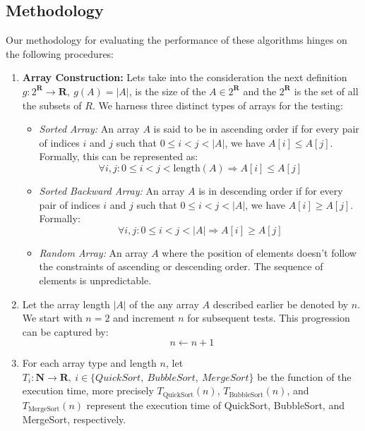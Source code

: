 \subsection{Methodology}
Our methodology for evaluating the performance of these algorithms hinges on the following procedures:
\begin{enumerate}
    \item \textbf{Array Construction:} Lets take into the consideration the next definition $g: 2^{\mathbf{R}} \rightarrow \mathbf{R},\  g(A) = |A|$, is the size of the $A \in 2^{\mathbf{R}}$ and the $2^{\mathbf{R}}$ is the set of all the subsets of $R$. We harness three distinct types of arrays for the testing:
    \begin{itemize}
        \item \textit{Sorted Array:} An array \( A \) is said to be in ascending order if for every pair of indices \( i \) and \( j \) such that \( 0 \leq i < j < |A| \), we have \( A[i] \leq A[j] \). Formally, this can be represented as:
        \[ \forall i, j : 0 \leq i < j < \text{length}(A) \Rightarrow A[i] \leq A[j] \]
        
        \item \textit{Sorted Backward Array:} An array \( A \) is in descending order if for every pair of indices \( i \) and \( j \) such that \( 0 \leq i < j < |A| \), we have \( A[i] \geq A[j] \). Formally:
        \[ \forall i, j : 0 \leq i < j < |A| \Rightarrow A[i] \geq A[j] \]
        
        \item \textit{Random Array:} An array \( A \) where the position of elements doesn't follow the constraints of ascending or descending order. The sequence of elements is unpredictable.
    \end{itemize}
    
    \item Let the array length $|A|$ of the any array $A$ described earlier be denoted by \( n \). We start with \( n = 2 \) and increment \( n \) for subsequent tests. This progression can be captured by:
\[ n \leftarrow n + 1 \]

\item For each array type and length \( n \), let $T_i: \mathbf{N} \rightarrow \mathbf{R}, \ i \in \{QuickSort,\  BubbleSort,\  MergeSort\}$ be the function of the execution time, more precisely  \( T_{\text{QuickSort}}(n) \), \( T_{\text{BubbleSort}}(n) \), and \( T_{\text{MergeSort}}(n) \) represent the execution time of QuickSort, BubbleSort, and MergeSort, respectively.


\end{enumerate}
